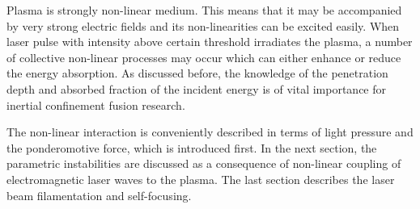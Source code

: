 Plasma is strongly non-linear medium. This means that it may be accompanied by very strong electric fields and its non-linearities can be excited easily. When laser pulse with intensity above certain threshold irradiates the plasma, a number of collective non-linear processes may occur which can either enhance or reduce the energy absorption. As discussed before, the knowledge of the penetration depth and absorbed fraction of the incident energy is of vital importance for inertial confinement fusion research. 

The non-linear interaction is conveniently described in terms of light pressure and the ponderomotive force, which is introduced first. In the next section, the parametric instabilities are discussed as a consequence of non-linear coupling of electromagnetic laser waves to the plasma. The last section describes the laser beam filamentation and self-focusing.